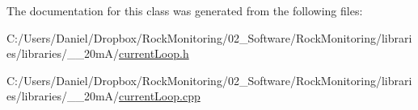 The documentation for this class was generated from the following files\+:\begin{DoxyCompactItemize}
\item 
C\+:/\+Users/\+Daniel/\+Dropbox/\+Rock\+Monitoring/02\+\_\+\+Software/\+Rock\+Monitoring/libraries/libraries/\+\_\+\_\+20m\+A/\hyperlink{current_loop_8h}{current\+Loop.\+h}\item 
C\+:/\+Users/\+Daniel/\+Dropbox/\+Rock\+Monitoring/02\+\_\+\+Software/\+Rock\+Monitoring/libraries/libraries/\+\_\+\_\+20m\+A/\hyperlink{current_loop_8cpp}{current\+Loop.\+cpp}\end{DoxyCompactItemize}
